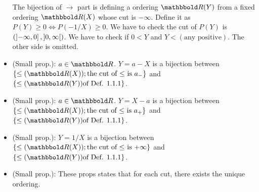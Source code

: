 \documentclass[9pt]{ltjsarticle}
\begin{document}
\begin{itemize}
  \pf
  The bijection of $\rightarrow$ part is defining
  a ordering $\R (Y)$ from a fixed ordering $\R (X)$ whose cut is
  $-\infty$.  Define it as
  $P(Y)\ge 0 \iff P(-1/X)\ge 0$.
  We have to check the cut of $P(Y)$ is $(\left]-\infty,0\right],\left] 0,\infty \right[)$.
  We have to check if $0<Y$ and $Y<(\text{any positive})$.
  The other side is omitted.
  \item
  (Small prop.): $a\in \R$.
  $Y=a-X$ is a bijection between
  $\set{\le (\R (X)); \text{the cut of $\le$ is $a_-$}}$
  and $\set{\le (\R (Y)) \text{of Def. 1.1.1} }$.
  \item
  (Small prop.): $a\in \R$.
  $Y=X-a$ is a bijection between
  $\set{\le (\R (X)); \text{the cut of $\le$ is $a_+$}}$
  and $\set{\le (\R (Y)) \text{of Def. 1.1.1} }$.
  \item
  (Small prop.):
  $Y=1/X$ is a bijection between
  $\set{\le (\R (X)); \text{the cut of $\le$ is $+\infty$}}$
  and $\set{\le (\R (Y)) \text{of Def. 1.1.1} }$.
  \item
  (Small prop.):
  These props states that for each cut, there exists the unique
  ordering.


\end{itemize}
\end{document}

